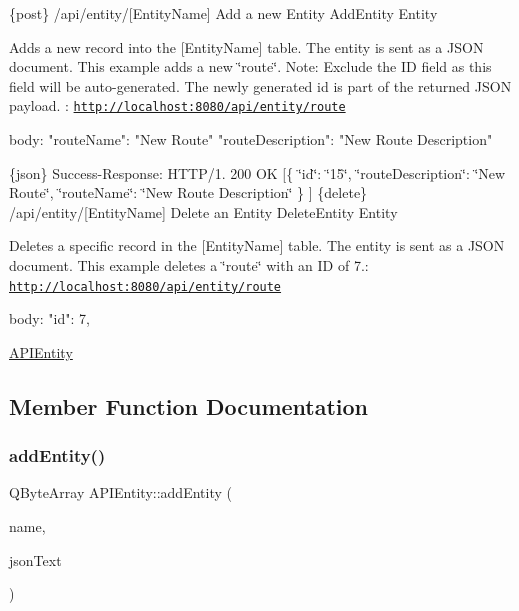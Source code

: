 \{post\} /api/entity/\mbox{[}Entity\+Name\mbox{]} Add a new Entity  Add\+Entity  Entity

Adds a new record into the \mbox{[}Entity\+Name\mbox{]} table. The entity is sent as a J\+S\+ON document.  This example adds a new \char`\"{}route\char`\"{}. Note\+: Exclude the ID field as this field will be auto-\/generated. The newly generated id is part of the returned J\+S\+ON payload. \+: \href{http://localhost:8080/api/entity/route}{\tt http\+://localhost\+:8080/api/entity/route} \begin{DoxyVerb}body:
{
  "routeName": "New Route"
  "routeDescription": "New Route Description"
}
\end{DoxyVerb}


\{json\} Success-\/\+Response\+: H\+T\+T\+P/1. 200 OK \mbox{[}\{ \char`\"{}id\char`\"{}\+: \char`\"{}15\char`\"{}, \char`\"{}route\+Description\char`\"{}\+: \char`\"{}\+New Route\char`\"{}, \char`\"{}route\+Name\char`\"{}\+: \char`\"{}\+New Route Description\char`\"{} \} \mbox{]}  \{delete\} /api/entity/\mbox{[}Entity\+Name\mbox{]} Delete an Entity  Delete\+Entity  Entity

Deletes a specific record in the \mbox{[}Entity\+Name\mbox{]} table. The entity is sent as a J\+S\+ON document.  This example deletes a \char`\"{}route\char`\"{} with an ID of 7.\+: \href{http://localhost:8080/api/entity/route}{\tt http\+://localhost\+:8080/api/entity/route} \begin{DoxyVerb}body:
{
  "id": 7,
}\end{DoxyVerb}
 \hyperlink{class_a_p_i_entity}{A\+P\+I\+Entity} 

\subsection{Member Function Documentation}
\mbox{\label{class_a_p_i_entity_a8bbe43bbc389472d7a7fd9e8a2283c82}} 
\subsubsection{\texorpdfstring{add\+Entity()}{addEntity()}}
{\footnotesize\ttfamily Q\+Byte\+Array A\+P\+I\+Entity\+::add\+Entity (\begin{DoxyParamCaption}\item[{const Q\+String \&}]{name,  }\item[{const Q\+String \&}]{json\+Text }\end{DoxyParamCaption})}

